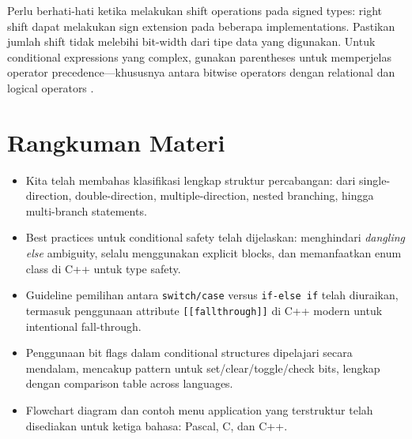 \documentclass[../main.tex]{subfiles}
\begin{document}
Perlu berhati-hati ketika melakukan shift operations pada signed types: right shift dapat melakukan sign extension pada beberapa implementations. Pastikan jumlah shift tidak melebihi bit-width dari tipe data yang digunakan. Untuk conditional expressions yang complex, gunakan parentheses untuk memperjelas operator precedence—khususnya antara bitwise operators dengan relational dan logical operators \parencite{iso-c-draft-n1570,cpp-reference}.

\section{Rangkuman Materi}
\begin{itemize}
  \item Kita telah membahas klasifikasi lengkap struktur percabangan: dari single-direction, double-direction, multiple-direction, nested branching, hingga multi-branch statements.
  \item Best practices untuk conditional safety telah dijelaskan: menghindari \emph{dangling else} ambiguity, selalu menggunakan explicit blocks, dan memanfaatkan enum class di C++ untuk type safety.
  \item Guideline pemilihan antara \texttt{switch/case} versus \texttt{if-else if} telah diuraikan, termasuk penggunaan attribute \texttt{[[fall\-through]]} di C++ modern untuk intentional fall-through.
  \item Penggunaan bit flags dalam conditional structures dipelajari secara mendalam, mencakup pattern untuk set/clear/toggle/check bits, lengkap dengan comparison table across languages.
  \item Flowchart diagram dan contoh menu application yang terstruktur telah disediakan untuk ketiga bahasa: Pascal, C, dan C++.
\end{itemize}
\end{document}
